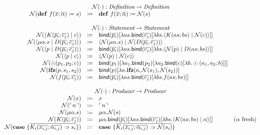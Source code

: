 \documentclass[nonacm]{acmart}
\newcommand{\lit}[1]{\ensuremath{\ulcorner #1 \urcorner}}
\newcommand{\cut}[2]{\ensuremath{\langle #1 \mid #2 \rangle}}
\newcommand{\ifz}[3]{\ensuremath{\mathbf{ifz}(#1, #2, #3)}}
\newcommand{\case}[1]{\ensuremath{\mathbf{case}\ \{ #1 \}}}
\newcommand{\defi}[2]{\ensuremath{\mathbf{def}\ #1 \coloneq #2}}
\newcommand{\name}[1]{\ensuremath{\mathcal{N}(#1)}}
\newcommand{\bind}[2]{\ensuremath{\mathsf{bind}(#1)[#2]}}
\newcommand{\fresh}[1]{\ensuremath{(#1\text{ fresh})}}
\begin{document}
\[
  \begin{array}{rcll}
    \\
    \multicolumn{4}{c}{\name{\cdot} : \emph{Definition} \rightarrow \emph{Definition}}\\
    \name{\defi{f(\overline{x}; \overline{\alpha})}{s}} & \coloneq & \defi{f(\overline{x}; \overline{\alpha})}{\name{s}} & \\
    \\
    \multicolumn{4}{c}{\name{\cdot} : \emph{Statement} \rightarrow \emph{Statement}}\\
    \name{\cut{K(\overline{p_i}; \overline{c_j})}{c}} & \coloneq & \bind{\overline{p_i}}{\lambda as.\bind{\overline{c_j}}{\lambda bs.\cut{K(as; bs)}{\name{c}}}} & \\
    \name{\cut{\mu\alpha.s}{D(\overline{p_i}; \overline{c_j})}} & \coloneq & \cut{\name{\mu\alpha.s}}{\name{D(\overline{p_i}; \overline{c_j})}} & \\
    \name{\cut{p}{D(\overline{p_i}; \overline{c_j})}} & \coloneq & \bind{\overline{p_i}}{\lambda as.\bind{\overline{c_j}}{\lambda bs.\cut{\name{p}}{D(as; bs)}}} & \\
    \name{\cut{p}{c}} & \coloneq & \cut{\name{p}}{\name{c}} & \\
    \name{\odot(p_1, p_2; c)}{} & \coloneq & \bind{p_1}{\lambda a_1.\bind{p_2}{\lambda a_2.\bind{c}{\lambda b.\odot(a_1, a_2; b)}}} & \\
    \name{\ifz{p}{s_1}{s_2}}{} & \coloneq & \bind{p}{\lambda a.\ifz{a}{\name{s_1}}{\name{s_2}}} & \\
    \name{f(\overline{p_i}; \overline{c_j})}{} & \coloneq & \bind{\overline{p_i}}{\lambda as.\bind{\overline{c_j}}{\lambda bs.f(as; bs)}} & \\
    \\
    \multicolumn{4}{c}{\name{\cdot} : \emph{Producer} \rightarrow \emph{Producer}}\\
    \name{x} & \coloneq & x & \\
    \name{\lit{n}} & \coloneq & \lit{n} & \\
    \name{\mu\alpha.s} & \coloneq & \mu\alpha.\name{s} & \\
    \name{K(\overline{p_i}; \overline{c_j})} & \coloneq & \mu\alpha.\bind{\overline{p_i}}{\lambda as.\bind{\overline{c_j}}{\lambda bs.\cut{K(as; bs)}{\alpha}}} & \fresh{\alpha} \\
    \name{\case{\overline{K_i(\overline{x_{i,j}}; \overline{\alpha_{i,j}}) \Rightarrow s_i}}} & \coloneq & \case{\overline{K_i(\overline{x_{i,j}}; \overline{\alpha_{i,j}}) \Rightarrow \name{s_i}}} & \\

\end{array}\]
\end{document}
